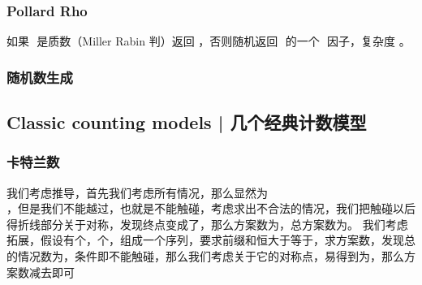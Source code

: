 \documentclass[8pt,a4paper]{article}
\newcommand{\code}[1]{
    
}
\newcommand{\txt}[1]{\par\noindent\footnotesize #1}
\newcommand{\inlineformula}[1]{\ensuremath{}}
\newcommand{\displayformula}[1]{%
    \vspace{0.2em}
    \[
        
    \]
}
\begin{document}
\begin{multicols}{2}
        \subsubsection{Pollard Rho}
            \txt{如果 \inlineformula{./assets/formulas_tex/formula_219.tex} 是质数（Miller Rabin 判）返回 \inlineformula{./assets/formulas_tex/formula_220.tex}，否则随机返回 \inlineformula{./assets/formulas_tex/formula_221.tex} 的一个 \inlineformula{./assets/formulas_tex/formula_222.tex} 因子，复杂度 \inlineformula{./assets/formulas_tex/formula_223.tex}。}
            \code{src/number_theory/技巧_Trick_3_5.cpp}
        \subsubsection{随机数生成}
            \code{src/number_theory/技巧_Trick_4_5.cpp}

    \subsection{Classic counting models | 几个经典计数模型}
        \subsubsection{卡特兰数}
            \txt{我们考虑推导，首先我们考虑所有情况，那么显然为\displayformula{./assets/formulas_tex/formula_224.tex}，但是我们不能越过\inlineformula{./assets/formulas_tex/formula_225.tex}，也就是不能触碰\inlineformula{./assets/formulas_tex/formula_226.tex}，考虑求出不合法的情况，我们把触碰\inlineformula{./assets/formulas_tex/formula_227.tex}以后得折线部分关于\inlineformula{./assets/formulas_tex/formula_228.tex}对称，发现终点变成了\inlineformula{./assets/formulas_tex/formula_229.tex}，那么方案数为\inlineformula{./assets/formulas_tex/formula_230.tex}，总方案数为\inlineformula{./assets/formulas_tex/formula_231.tex}。
我们考虑拓展，假设有\inlineformula{./assets/formulas_tex/formula_232.tex}个\inlineformula{./assets/formulas_tex/formula_233.tex}，\inlineformula{./assets/formulas_tex/formula_234.tex}个\inlineformula{./assets/formulas_tex/formula_235.tex}，组成一个序列，要求前缀和恒大于等于\inlineformula{./assets/formulas_tex/formula_236.tex}，求方案数，发现总的情况数为\inlineformula{./assets/formulas_tex/formula_237.tex}，条件即不能触碰\inlineformula{./assets/formulas_tex/formula_238.tex}，那么我们考虑\inlineformula{./assets/formulas_tex/formula_239.tex}关于它的对称点，易得到为\inlineformula{./assets/formulas_tex/formula_240.tex}，那么方案数减去\inlineformula{./assets/formulas_tex/formula_241.tex}即可}

\end{multicols}
\end{document}
